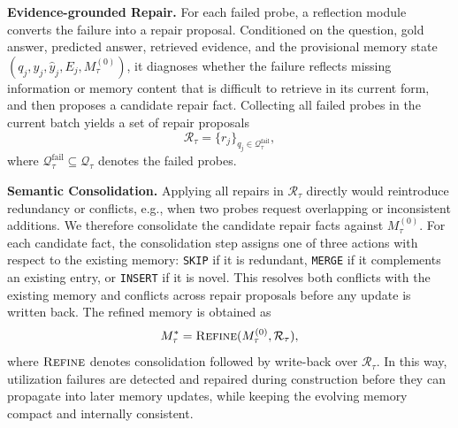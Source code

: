 \noindent\textbf{Evidence-grounded Repair.}
For each failed probe, a reflection module converts the failure into a repair proposal.
Conditioned on the question, gold answer, predicted answer, retrieved evidence, and the provisional memory state $(q_j, y_j, \hat{y}_j, E_j, M_{\tau}^{(0)})$, it diagnoses whether the failure reflects missing information or memory content that is difficult to retrieve in its current form, and then proposes a candidate repair fact.
Collecting all failed probes in the current batch yields a set of repair proposals
\begin{equation}
    \mathcal{R}_\tau = \{r_j\}_{q_j \in \mathcal{Q}_\tau^{\mathrm{fail}}},
\end{equation}
where $\mathcal{Q}_\tau^{\mathrm{fail}} \subseteq \mathcal{Q}_\tau$ denotes the failed probes.

\noindent\textbf{Semantic Consolidation.}
Applying all repairs in $\mathcal{R}_\tau$ directly would reintroduce redundancy or conflicts, e.g., when two probes request overlapping or inconsistent additions.
We therefore consolidate the candidate repair facts against $M_{\tau}^{(0)}$.
For each candidate fact, the consolidation step assigns one of three actions with respect to the existing memory: \texttt{SKIP} if it is redundant, \texttt{MERGE} if it complements an existing entry, or \texttt{INSERT} if it is novel.
This resolves both conflicts with the existing memory and conflicts across repair proposals before any update is written back.
The refined memory is obtained as
\begin{equation}
M_{\tau}^{*} = \textsc{Refine}(M_{\tau}^{(0)}, \mathcal{R}_\tau),
\end{equation}
where $\textsc{Refine}$ denotes consolidation followed by write-back over $\mathcal{R}_\tau$.
In this way, utilization failures are detected and repaired during construction before they can propagate into later memory updates, while keeping the evolving memory compact and internally consistent.
